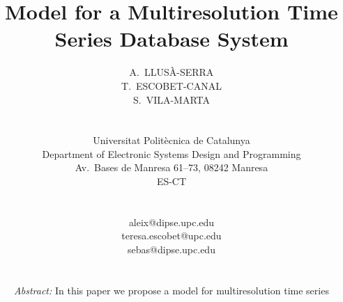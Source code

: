 \documentclass[twocolumn,11pt,a4paper]{article}
\begin{document}
\global\def\refname{{\normalsize \it References:}}
%
\baselineskip 12.5pt
%
%
%
\title{\LARGE \bf Model for a Multiresolution Time Series Database
  System}

\date{}

\author{\hspace*{-10pt}
  \begin{minipage}[t]{2.3in} \normalsize \baselineskip 12.5pt
    \centerline{\scshape A.~LLUSÀ-SERRA}
  \end{minipage} \kern 0in
  \begin{minipage}[t]{2.3in} \normalsize \baselineskip 12.5pt
    \centerline{\scshape T.~ESCOBET-CANAL}
  \end{minipage} \kern 0in
  \begin{minipage}[t]{2.3in} \normalsize \baselineskip 12.5pt
    \centerline{\scshape S.~VILA-MARTA}
  \end{minipage} \\ \hspace*{-10pt}
  \begin{minipage}[t]{2.7in} \normalsize \baselineskip 12.5pt
    \centerline{Universitat Politècnica de Catalunya}
    \centerline{Department of Electronic Systems Design and Programming}
    \centerline{Av.~Bases de Manresa 61--73, 08242 Manresa}
    \centerline{\scshape ES-CT}
  \end{minipage}
  \\[14pt]
  \begin{minipage}[t]{2.3in} \normalsize \baselineskip 12.5pt
    \centerline{aleix@dipse.upc.edu}
  \end{minipage} \kern 0in
  \begin{minipage}[t]{2.3in} \normalsize \baselineskip 12.5pt
    \centerline{teresa.escobet@upc.edu}
  \end{minipage} \kern 0in
  \begin{minipage}[t]{2.3in} \normalsize \baselineskip 12.5pt
    \centerline{sebas@dipse.upc.edu}
  \end{minipage} 
  \\[5pt]
  \begin{minipage}[b]{6.9in} \normalsize
    \baselineskip 12.5pt {\it Abstract:}
    In this paper we propose a model for multiresolution time series

\end{minipage}}
\end{document}
